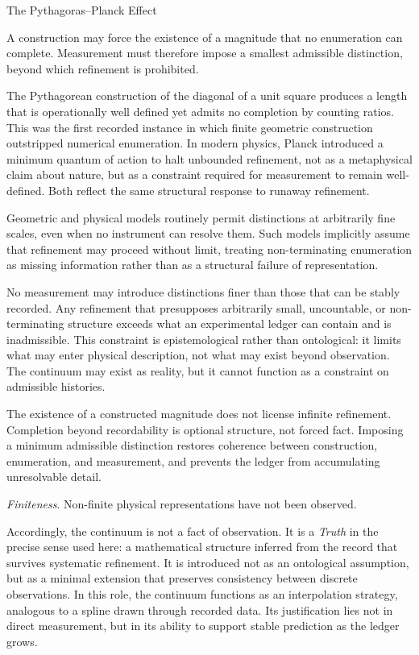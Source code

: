 \begin{phenom}{The Pythagoras--Planck Effect~\cite{euclid300bc,planck1900}}
\label{Finiteness}

\PhStatement
A construction may force the existence of a magnitude that no enumeration can
complete. Measurement must therefore impose a smallest admissible distinction,
beyond which refinement is prohibited.

\PhOrigin
The Pythagorean construction of the diagonal of a unit square produces a length
that is operationally well defined yet admits no completion by counting ratios.
This was the first recorded instance in which finite geometric construction
outstripped numerical enumeration. In modern physics, Planck introduced a
minimum quantum of action to halt unbounded refinement, not as a metaphysical
claim about nature, but as a constraint required for measurement to remain
well-defined. Both reflect the same structural response to runaway refinement.

\PhObservation
Geometric and physical models routinely permit distinctions at arbitrarily fine
scales, even when no instrument can resolve them. Such models implicitly assume
that refinement may proceed without limit, treating non-terminating enumeration
as missing information rather than as a structural failure of representation.

\PhConstraint
No measurement may introduce distinctions finer than those that can be
stably recorded. Any refinement that presupposes arbitrarily small, uncountable,
or non-terminating structure exceeds what an experimental ledger can contain
and is inadmissible. 
This constraint is epistemological rather than ontological: it limits what 
may enter physical description, not what may exist beyond observation. The 
continuum may exist as reality, but it cannot function as a constraint on 
admissible histories.

\PhConsequence
The existence of a constructed magnitude does not license infinite refinement.
Completion beyond recordability is optional structure, not forced fact.
Imposing a minimum admissible distinction restores coherence between
construction, enumeration, and measurement, and prevents the ledger from
accumulating unresolvable detail.

\PhInvariant
\emph{Finiteness}. Non-finite physical representations have not been observed.
\end{phenom}


Accordingly, the continuum is not a fact of observation. It is a \emph{Truth} in
the precise sense used here: a mathematical structure inferred from the record
that survives systematic refinement. It is introduced not as an ontological
assumption, but as a minimal extension that preserves consistency between
discrete observations. In this role, the continuum functions as an interpolation
strategy, analogous to a spline drawn through recorded data. Its justification
lies not in direct measurement, but in its ability to support stable prediction
as the ledger grows.

